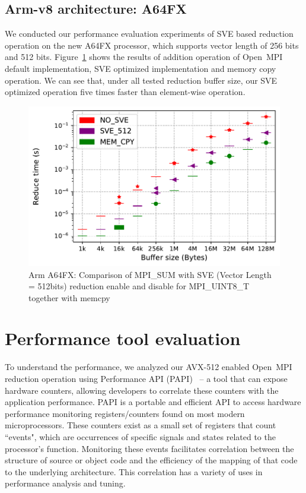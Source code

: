 \documentclass[5p,times,twocolumn]{elsarticle}
\newcommand{\ompi}[0]{Open~MPI\xspace}
\begin{document}
\subsection{Arm-v8 architecture: A64FX}
We conducted our performance evaluation experiments of SVE based reduction operation on
the new A64FX processor, which supports vector length of 256 bits and 512 bits.
Figure~\ref{fig:armsum} shows the results of addition operation of \ompi default implementation,
SVE optimized implementation and memory copy operation. We can see that, under all tested reduction
buffer size, our SVE optimized operation five times faster than element-wise operation.

\begin{figure}[h]
    \centering
    \includegraphics[width=\linewidth]{sve512_extend_more_sum_u8_1k-128M.pdf}
    \caption{Arm A64FX: Comparison of MPI\_SUM with SVE (Vector Length = 512bits) reduction enable and disable for MPI\_UINT8\_T together with memcpy}
    \label{fig:armsum}
\end{figure}

\section{Performance tool evaluation}\label{sec:perf}
To understand the performance, we analyzed our AVX-512 enabled \ompi reduction
operation using Performance API (PAPI)~\cite{papi} -- a tool that can expose
hardware counters, allowing developers to correlate these counters
with the application performance.
PAPI is a portable and efficient API to access hardware performance
monitoring registers/counters found on most modern microprocessors.
These counters exist
as a small set of registers that count ``events", which are occurrences of specific signals
and states related to the processor's function. Monitoring these events facilitates
correlation between the structure of source or object code and the efficiency of the mapping
of that code to the underlying architecture. This correlation has a variety of uses in
performance analysis and tuning.
\end{document}
